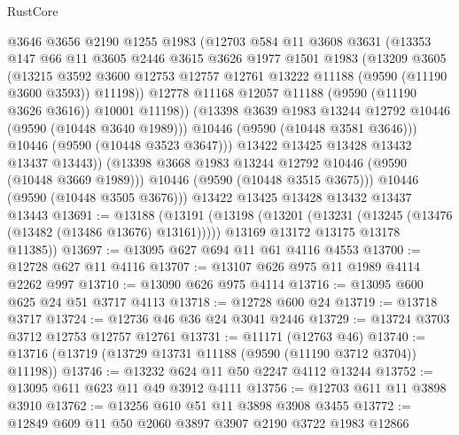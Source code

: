 \begin{lexlean}{RustCore}
\begin{coremodule}
                @3646
                @3656
                @2190
                @1255
                @1983
                (@12703
                  @584
                  @11
                  @3608
                  @3631
                  (@13353
                    @147
                    @66
                    @11
                    @3605
                    @2446
                    @3615
                    @3626
                    @1977
                    @1501
                    @1983
                    (@13209
                      @3605
                      (@13215
                        @3592
                        @3600
                        @12753
                        @12757
                        @12761
                        @13222
                        @11188
                        (@9590 (@11190 @3600 @3593))
                        @11198))
                    @12778
                    @11168
                    @12057
                    @11188
                    (@9590 (@11190 @3626 @3616))
                    @10001
                    @11198))
                (@13398 @3639 @1983 @13244 @12792 @10446 (@9590 (@10448 @3640 @1989)))
                @10446
                (@9590 (@10448 @3581 @3646)))
              @10446
              (@9590 (@10448 @3523 @3647)))
            @13422
            @13425
            @13428
            @13432
            @13437
            @13443))
        (@13398 @3668 @1983 @13244 @12792 @10446 (@9590 (@10448 @3669 @1989)))
        @10446
        (@9590 (@10448 @3515 @3675)))
      @10446
      (@9590 (@10448 @3505 @3676)))
    @13422
    @13425
    @13428
    @13432
    @13437
    @13443
@13691 := @13188
    (@13191
      (@13198
        (@13201 (@13231 (@13245 (@13476 (@13482 (@13486 @13676) @13161)))))
        @13169
        @13172
        @13175
        @13178
        @11385))
@13697 := @13095 @627 @694 @11 @61 @4116 @4553
@13700 := @12728 @627 @11 @4116
@13707 := @13107 @626 @975 @11 @1989 @4114 @2262 @997
@13710 := @13090 @626 @975 @4114
@13716 := @13095 @600 @625 @24 @51 @3717 @4113
@13718 := @12728 @600 @24
@13719 := @13718 @3717
@13724 := @12736 @46 @36 @24 @3041 @2446
@13729 := @13724 @3703 @3712 @12753 @12757 @12761
@13731 := @11171 (@12763 @46)
@13740 := @13716 (@13719 (@13729 @13731 @11188 (@9590 (@11190 @3712 @3704)) @11198))
@13746 := @13232 @624 @11 @50 @2247 @4112 @13244
@13752 := @13095 @611 @623 @11 @49 @3912 @4111
@13756 := @12703 @611 @11 @3898 @3910
@13762 := @13256 @610 @51 @11 @3898 @3908 @3455
@13772 := @12849 @609 @11 @50 @2060 @3897 @3907 @2190 @3722 @1983 @12866

\end{coremodule}
\end{lexlean}
